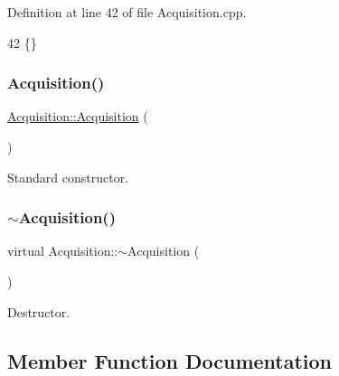 Definition at line 42 of file Acquisition.\+cpp.


\begin{DoxyCode}
42 \{\} 
\end{DoxyCode}
\mbox{\label{classAcquisition_aa7d3138495a4a8888c21b33f4d657732}} 
\subsubsection{\texorpdfstring{Acquisition()}{Acquisition()}\hspace{0.1cm}{\footnotesize\ttfamily [2/2]}}
{\footnotesize\ttfamily \hyperlink{classAcquisition_1_1Acquisition}{Acquisition\+::\+Acquisition} (\begin{DoxyParamCaption}{ }\end{DoxyParamCaption})}



Standard constructor. 

\mbox{\label{classAcquisition_af697b51bd72afcfe8f9f3f368743d20d}} 
\subsubsection{\texorpdfstring{$\sim$\+Acquisition()}{~Acquisition()}\hspace{0.1cm}{\footnotesize\ttfamily [2/2]}}
{\footnotesize\ttfamily virtual Acquisition\+::$\sim$\+Acquisition (\begin{DoxyParamCaption}{ }\end{DoxyParamCaption})\hspace{0.3cm}{\ttfamily [virtual]}}



Destructor. 



\subsection{Member Function Documentation}
\mbox{\label{classAcquisition_a8af496b6202d2509814e3b02197a5e73}} 
